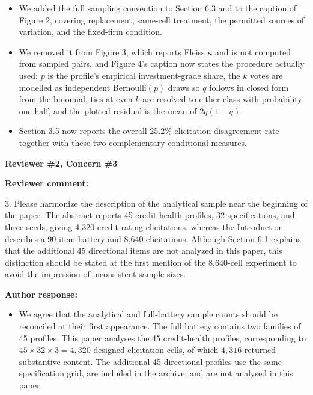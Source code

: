 \documentclass[11pt]{article}
\newcommand{\rvcomment}[1]{{\color{ReviewerGreen}#1}}
\newcommand{\concern}[1]{\textbf{\color{ReviewerGreen}#1}}
\begin{document}
\begin{itemize}
\item We added the full sampling convention to Section 6.3 and to the caption of Figure 2, covering replacement, same-cell treatment, the permitted sources of variation, and the fixed-firm condition.
\item We removed it from Figure 3, which reports Fleiss $\kappa$ and is not computed from sampled pairs, and Figure 4's caption now states the procedure actually used: $p$ is the profile's empirical investment-grade share, the $k$ votes are modelled as independent Bernoulli$(p)$ draws so $q$ follows in closed form from the binomial, ties at even $k$ are resolved to either class with probability one half, and the plotted residual is the mean of $2q(1-q)$.
\item Section 3.5 now reports the overall 25.2\% elicitation-disagreement rate together with these two complementary conditional measures.
\end{itemize}

\vspace{4pt}

\concern{Reviewer \#2, Concern \#3}

\concern{Reviewer comment:}

\rvcomment{3. Please harmonize the description of the analytical sample near the beginning of the
paper. The abstract reports 45 credit-health profiles, 32 specifications, and three seeds, giving
4,320 credit-rating elicitations, whereas the Introduction describes a 90-item battery and 8,640
elicitations. Although Section 6.1 explains that the additional 45 directional items are not
analyzed in this paper, this distinction should be stated at the first mention of the 8,640-cell
experiment to avoid the impression of inconsistent sample sizes.}

\textbf{Author response:}

\begin{itemize}
\item We agree that the analytical and full-battery sample counts should be reconciled at their first
appearance. The full battery contains two families of 45 profiles. This paper analyses the 45
credit-health profiles, corresponding to $45\times32\times3=4{,}320$ designed elicitation cells, of
which $4{,}316$ returned substantive content. The additional 45 directional profiles use the same
specification grid, are included in the archive, and are not analysed in this paper.
\end{itemize}
\end{document}
